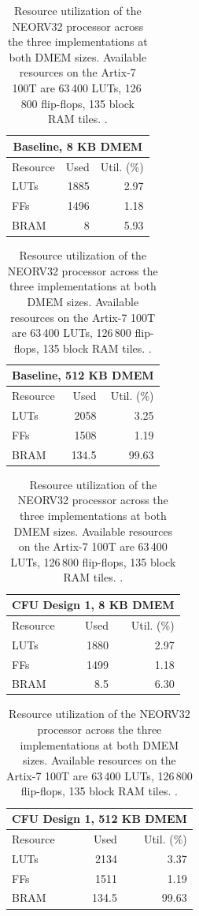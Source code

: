 \begin{table}[H]
\centering
\caption{Resource utilization of the NEORV32 processor across the three
implementations at both DMEM sizes. Available resources on the Artix-7 100T are
63\,400 LUTs, 126\,800 flip-flops, 135 block RAM tiles.
\cite{amd_ds180_7series}.}
\label{tab:res_processor}

\begin{minipage}{0.48\textwidth}\centering
\begin{tabular}{|l|r|r|}
\hline
\multicolumn{3}{|c|}{\textbf{Baseline, 8 KB DMEM}} \\ \hline
Resource & Used & Util. (\%) \\ \hline
LUTs & 1885 & 2.97 \\ \hline
FFs  & 1496 & 1.18 \\ \hline
BRAM & 8    & 5.93 \\ \hline

\end{tabular}
\end{minipage}\hfill
\begin{minipage}{0.48\textwidth}\centering
\begin{tabular}{|l|r|r|}
\hline
\multicolumn{3}{|c|}{\textbf{Baseline, 512 KB DMEM}} \\ \hline
Resource & Used & Util. (\%) \\ \hline
LUTs & 2058  & 3.25 \\ \hline
FFs  & 1508  & 1.19 \\ \hline
BRAM & 134.5 & 99.63 \\ \hline

\end{tabular}
\end{minipage}

\vspace{15pt}

\begin{minipage}{0.48\textwidth}\centering
\begin{tabular}{|l|r|r|}
\hline
\multicolumn{3}{|c|}{\textbf{CFU Design 1, 8 KB DMEM}} \\ \hline
Resource & Used & Util. (\%) \\ \hline
LUTs & 1880 & 2.97 \\ \hline
FFs  & 1499 & 1.18 \\ \hline
BRAM & 8.5 & 6.30 \\ \hline

\end{tabular}
\end{minipage}\hfill
\begin{minipage}{0.48\textwidth}\centering
\begin{tabular}{|l|r|r|}
\hline
\multicolumn{3}{|c|}{\textbf{CFU Design 1, 512 KB DMEM}} \\ \hline
Resource & Used & Util. (\%) \\ \hline
LUTs & 2134     & 3.37  \\ \hline
FFs  & 1511     & 1.19  \\ \hline
BRAM & 134.5    & 99.63  \\ \hline


\end{tabular}
\end{minipage}
\end{table}
